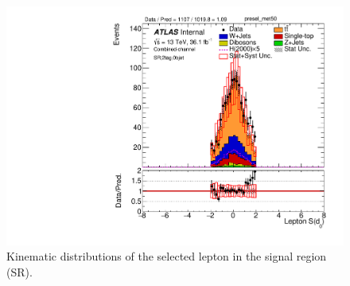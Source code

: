\begin{figure}[!h]
\begin{center}
\includegraphics[scale=0.33]{./figures/boosted/PlotsInMbbSR/Unblinded/DataMC_2tag_0bjet_SR_lepton_presel_met50_Lep_d0sigL}
\caption{Kinematic distributions of the selected lepton in the signal region (SR).}
\label{fig:boosted_SR_lepton}
\end{center}
\end{figure}


